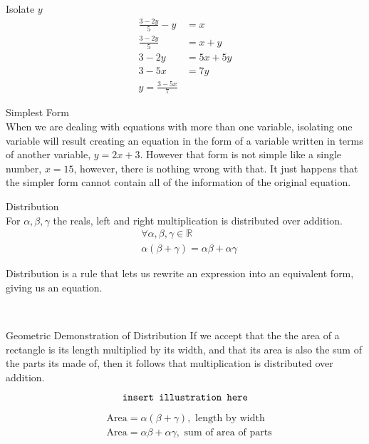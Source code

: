 \documentclass{book}
\begin{document}
  {\example Isolate $y$ \\
    \begin{align*}
      \frac{3 - 2y}{5} - y & = x\\
      \frac{3 - 2y}{5} & = x + y\\
      3 - 2y & = 5x + 5y\\
      3 - 5x & = 7y\\
      y = \frac{3 - 5x}{7}
    \end{align*}
  }

  {\remark Simplest Form \\
    When we are dealing with equations with more than one variable, isolating one variable will result creating an equation in the form of a variable written in terms of another variable, $y = 2x + 3$. However that form is not simple like a single number, $x = 15$, however, there is nothing wrong with that. It just happens that the simpler form cannot contain all of the information of the original equation.
  }\\

  {\axiom Distribution \\
    For $\alpha, \beta, \gamma$ the reals, left and right multiplication is distributed over addition.
    \begin{align*}
      & \forall \alpha, \beta, \gamma \in \mathbb{R}\\
      & \alpha (\beta + \gamma) = \alpha \beta + \alpha \gamma
    \end{align*}

    Distribution is a rule that lets us rewrite an expression into an equivalent form, giving us an equation.
  }\\

  {\remark Geometric Demonstration of Distribution 
    If we accept that the the area of a rectangle is its length multiplied by its width, and that its area is also the sum of the parts its made of, then it follows that multiplication is distributed over addition.

    $$\text{\texttt{insert illustration here}}$$

    \begin{align*}
      & \text{Area} = \alpha (\beta + \gamma), \text{ length by width}\\
      & \text{Area} = \alpha \beta + \alpha \gamma, \text{ sum of area of parts}
    \end{align*}
  }
\end{document}
